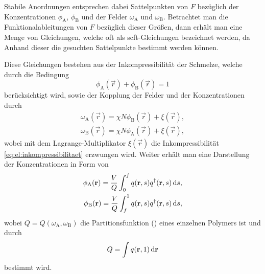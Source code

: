 Stabile Anordnungen entsprechen dabei Sattelpunkten von $F$ bezüglich der Konzentrationen $\phi_{\mathrm{A}}$, $\phi_{\mathrm{B}}$ und der Felder $\omega_{\mathrm{A}}$ und $\omega_{\mathrm{B}}$.
Betrachtet man die Funktionalableitungen von $F$ bezüglich dieser Größen, dann erhält man eine Menge von Gleichungen, welche oft als \ac{scft}-Gleichungen bezeichnet werden, da Anhand dieser die gesuchten Sattelpunkte bestimmt werden können.

Diese Gleichungen bestehen aus der Inkompressibilität der Schmelze, welche durch die Bedingung
\begin{equation}
\label{eq:el:inkompressibilitaet}
    \phi_{\mathrm{A}}(\vec{r}) + \phi_{\mathrm{B}}(\vec{r}) = 1
\end{equation}%
berücksichtigt wird, sowie der Kopplung der Felder und der Konzentrationen durch
\begin{equation}
\label{eq:el:felder}
    \begin{aligned}
        \omega_{\mathrm{A}}(\vec{r}) = \chi N \phi_{\mathrm{B}}(\vec{r}) + \xi(\vec{r}),\\
        \omega_{\mathrm{B}}(\vec{r}) = \chi N \phi_{\mathrm{A}}(\vec{r}) + \xi(\vec{r}),
    \end{aligned}
\end{equation}%
wobei mit dem Lagrange-Multiplikator $\xi(\vec{r})$ die Inkompressibilität \cref{eq:el:inkompressibilitaet} erzwungen wird.
Weiter erhält man eine Darstellung der Konzentrationen in Form von
\begin{equation}
\label{eq:el:konzentrationen}
    \begin{aligned}
        \phi_{\mathrm{A}}(\mathbf{r}) = \frac{V}{Q} \int_{0}^{f} q(\mathbf{r}, s) q^{\dagger}(\mathbf{r}, s) \mathop{}\!\mathrm{d} s,\\
        \phi_{\mathrm{B}}(\mathbf{r}) = \frac{V}{Q} \int_{f}^{1} q(\mathbf{r}, s) q^{\dagger}(\mathbf{r}, s) \mathop{}\!\mathrm{d} s,
    \end{aligned}
\end{equation}%
wobei $Q = Q(\omega_{\mathrm{A}}, \omega_{\mathrm{B}})$ die Partitionsfunktion () eines einzelnen Polymers ist und durch
\begin{equation}
\label{eq:el:partitionsfunktion}
    Q = \int q(\mathbf{r}, 1) \mathop{}\!\mathrm{d} \mathbf{r}
\end{equation}%
bestimmt wird.

